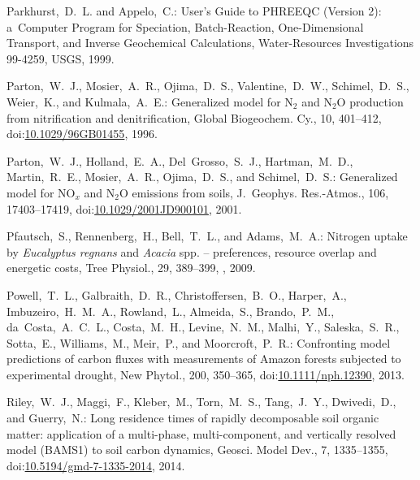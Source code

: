 \documentclass[gmdd, online, hvmath]{copernicus}
\begin{document}
\begin{thebibliography}{55}
Parkhurst,~D.~L. and Appelo,~C.:
User's Guide to PHREEQC (Version 2): a~Computer Program for Speciation, Batch-Reaction, One-Dimensional Transport, and Inverse Geochemical Calculations,
Water-Resources Investigations 99-4259,
USGS,   1999.


Parton,~W.~J., Mosier,~A.~R., Ojima,~D.~S., Valentine,~D.~W., Schimel,~D.~S., Weier,~K., and Kulmala,~A.~E.:
Generalized model for N$_2$ and N$_2$O production from nitrification and denitrification,
Global Biogeochem. Cy.,
10, 401--412,
doi:\href{http://dx.doi.org/10.1029/96GB01455}{10.1029/96GB01455}, 1996.


Parton,~W.~J., Holland,~E.~A., Del~Grosso,~S.~J., Hartman,~M.~D., Martin,~R.~E., Mosier,~A.~R., Ojima,~D.~S., and Schimel,~D.~S.:
Generalized model for NO$_x$ and N$_2$O emissions from soils,
J.~Geophys. Res.-Atmos.,
106, 17403--17419,
doi:\href{http://dx.doi.org/10.1029/2001JD900101}{10.1029/2001JD900101}, 2001.


Pfautsch,~S., Rennenberg,~H., Bell,~T.~L., and Adams,~M.~A.:
Nitrogen uptake by \textit{Eucalyptus regnans} and \textit{Acacia} spp. -- preferences, resource overlap and energetic costs,
Tree Physiol.,
29, 389--399,
, 2009.


Powell,~T.~L., Galbraith,~D.~R., Christoffersen,~B.~O., Harper,~A., Imbuzeiro,~H.~M.~A., Rowland,~L., Almeida,~S., Brando,~P.~M., da~Costa,~A.~C.~L., Costa,~M.~H., Levine,~N.~M., Malhi,~Y., Saleska,~S.~R., Sotta,~E., Williams,~M., Meir,~P., and Moorcroft,~P.~R.: Confronting model predictions of carbon fluxes with measurements of Amazon forests subjected to experimental drought,
New Phytol.,
200, 350--365,
doi:\href{http://dx.doi.org/10.1111/nph.12390}{10.1111/nph.12390}, 2013.



Riley,~W.~J., Maggi,~F., Kleber,~M., Torn,~M.~S., Tang,~J.~Y., Dwivedi,~D., and Guerry,~N.: Long residence times of rapidly decomposable soil organic matter: application of a multi-phase, multi-component, and vertically resolved model (BAMS1)  to soil carbon dynamics, Geosci. Model Dev., 7, 1335--1355,
doi:\href{http://dx.doi.org/10.5194/gmd-7-1335-2014}{10.5194/gmd-7-1335-2014}, 2014.






\end{thebibliography}
\end{document}
